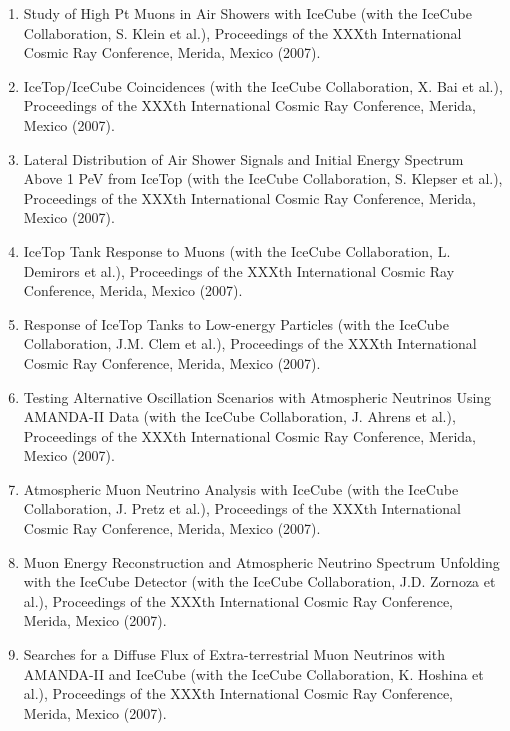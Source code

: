 \begin{enumerate}
\item Study of High Pt Muons in Air Showers with IceCube (with the
  IceCube Collaboration, S. Klein et al.), Proceedings of the XXXth
  International Cosmic Ray Conference, Merida, Mexico (2007).

\item IceTop/IceCube Coincidences (with the IceCube Collaboration,
  X. Bai et al.), Proceedings of the XXXth International Cosmic Ray
  Conference, Merida, Mexico (2007).

\item Lateral Distribution of Air Shower Signals and Initial Energy
  Spectrum Above 1 PeV from IceTop (with the IceCube Collaboration,
  S. Klepser et al.), Proceedings of the XXXth International Cosmic
  Ray Conference, Merida, Mexico (2007).

\item IceTop Tank Response to Muons (with the IceCube Collaboration,
  L. Demirors et al.), Proceedings of the XXXth International Cosmic
  Ray Conference, Merida, Mexico (2007).

\item Response of IceTop Tanks to Low-energy Particles (with the
  IceCube Collaboration, J.M. Clem et al.), Proceedings of the XXXth
  International Cosmic Ray Conference, Merida, Mexico (2007).

\item Testing Alternative Oscillation Scenarios with Atmospheric
  Neutrinos Using AMANDA-II Data (with the IceCube Collaboration,
  J. Ahrens et al.), Proceedings of the XXXth International Cosmic Ray
  Conference, Merida, Mexico (2007).

\item Atmospheric Muon Neutrino Analysis with IceCube (with the
  IceCube Collaboration, J. Pretz et al.), Proceedings of the XXXth
  International Cosmic Ray Conference, Merida, Mexico (2007).

\item Muon Energy Reconstruction and Atmospheric Neutrino Spectrum
  Unfolding with the IceCube Detector (with the IceCube Collaboration,
  J.D. Zornoza et al.), Proceedings of the XXXth International Cosmic
  Ray Conference, Merida, Mexico (2007).

\item Searches for a Diffuse Flux of Extra-terrestrial Muon Neutrinos
  with AMANDA-II and IceCube (with the IceCube Collaboration,
  K. Hoshina et al.), Proceedings of the XXXth International Cosmic
  Ray Conference, Merida, Mexico (2007).


\end{enumerate}
